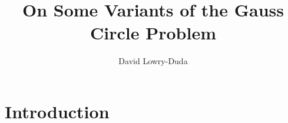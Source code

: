 \documentclass[12pt]{report}   %
\title{On Some Variants of the Gauss Circle Problem}
\author{David Lowry-Duda}
\theoremstyle{definition}
\begin{document}


\begin{preliminaries}
\maketitle

\copyrightpage


\begin{abstract}
  
  \thispagestyle{empty}
\end{abstract}


\begin{dedication}
  
\end{dedication}


\begin{acknowledgments}
  
\end{acknowledgments}


\begin{spacing}{1}
  \tableofcontents
  \clearpage{\pagestyle{empty}\cleardoublepage}

  \footnotesize
  \fontsize{11.5pt}{12.5pt}\selectfont

  \normalsize
\end{spacing}

\end{preliminaries}



\pagestyle{myheadings}




%

\chapter{Introduction}\label{c:introduction}

\clearpage{\pagestyle{empty}\cleardoublepage}
\end{document}
